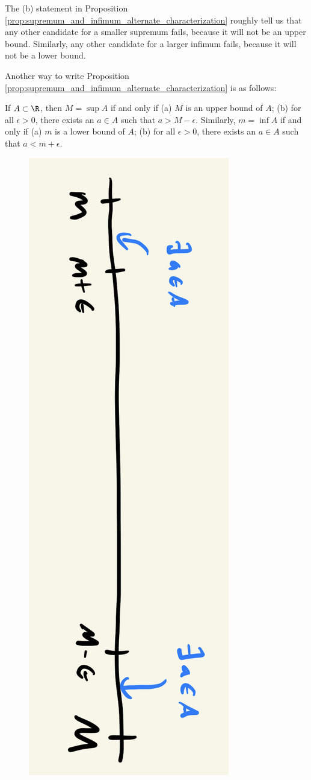 \documentclass{article} %
\begin{document}
\begin{remark}
The (b) statement in Proposition \ref{prop:supremum_and_infimum_alternate_characterization} roughly tell us that any other candidate for a smaller supremum fails, because it will not be an upper bound.  Similarly, any other candidate for a larger infimum fails, because it will not be a lower bound. 	
\end{remark}

\begin{remark}
Another way to write Proposition \ref{prop:supremum_and_infimum_alternate_characterization} is as follows:	

If $A \subset \R$, then $M = \sup A$ if and only if (a) $M$ is an upper bound of $A$; (b) for all $\epsilon >0$, there exists an $a \in A$ such that $a>M-\epsilon$.  Similarly, $m = \inf A$ if and only if (a) $m$ is a lower bound of $A$; (b) for all $\epsilon >0$, there exists an $a \in A$ such that $a<m+\epsilon$.

\begin{figure}[H]
\centering
\includegraphics[angle=90, width=.5\textwidth]{images/infimum_and_supremum}
\end{figure}
\label{rk:usage_of_alternate_characterization_of_inf_and_sup}
\end{remark}
\end{document}
